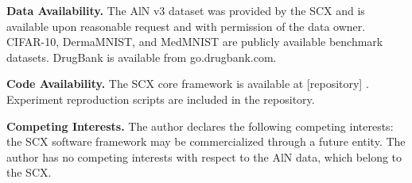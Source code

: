 \documentclass[12pt,a4paper]{article}
\begin{document}
\textbf{Data Availability.}
The AlN v3 dataset was provided by the SCX and is available upon reasonable request and with permission of the data owner. CIFAR-10, DermaMNIST, and MedMNIST are publicly available benchmark datasets. DrugBank is available from go.drugbank.com.

\textbf{Code Availability.}
The SCX core framework is available at [repository] . Experiment reproduction scripts are included in the repository.

\textbf{Competing Interests.}
The author declares the following competing interests: the SCX software framework may be commercialized through a future entity. The author has no competing interests with respect to the AlN data, which belong to the SCX.
\end{document}
